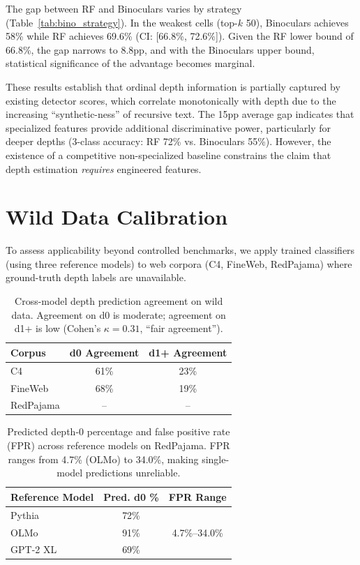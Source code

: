 \documentclass[11pt,a4paper]{article}
\begin{document}
The gap between RF and Binoculars varies by strategy (Table~\ref{tab:bino_strategy}). In the weakest cells (top-$k$ 50), Binoculars achieves 58\% while RF achieves 69.6\% (CI: [66.8\%, 72.6\%]). Given the RF lower bound of 66.8\%, the gap narrows to 8.8pp, and with the Binoculars upper bound, statistical significance of the advantage becomes marginal.

These results establish that ordinal depth information is partially captured by existing detector scores, which correlate monotonically with depth due to the increasing ``synthetic-ness'' of recursive text. The 15pp average gap indicates that specialized features provide additional discriminative power, particularly for deeper depths (3-class accuracy: RF 72\% vs. Binoculars 55\%). However, the existence of a competitive non-specialized baseline constrains the claim that depth estimation \emph{requires} engineered features.

\section{Wild Data Calibration}

To assess applicability beyond controlled benchmarks, we apply trained classifiers (using three reference models) to web corpora (C4, FineWeb, RedPajama) where ground-truth depth labels are unavailable.

\begin{table}[t]
\centering
\caption{Cross-model depth prediction agreement on wild data. Agreement on d0 is moderate; agreement on d1+ is low (Cohen's $\kappa = 0.31$, ``fair agreement'').}
\label{tab:wild}
\small
\begin{tabular}{lcc}
\toprule
\textbf{Corpus} & \textbf{d0 Agreement} & \textbf{d1+ Agreement} \\
\midrule
C4 & 61\% & 23\% \\
FineWeb & 68\% & 19\% \\
RedPajama & -- & -- \\
\bottomrule
\end{tabular}
\end{table}

\begin{table}[t]
\centering
\caption{Predicted depth-0 percentage and false positive rate (FPR) across reference models on RedPajama. FPR ranges from 4.7\% (OLMo) to 34.0\%, making single-model predictions unreliable.}
\label{tab:wild_fpr}
\small
\begin{tabular}{lcc}
\toprule
\textbf{Reference Model} & \textbf{Pred. d0 \%} & \textbf{FPR Range} \\
\midrule
Pythia & 72\% & \multirow{3}{*}{4.7\%--34.0\%} \\
OLMo & 91\% & \\
GPT-2 XL & 69\% & \\
\bottomrule
\end{tabular}
\end{table}
\end{document}
